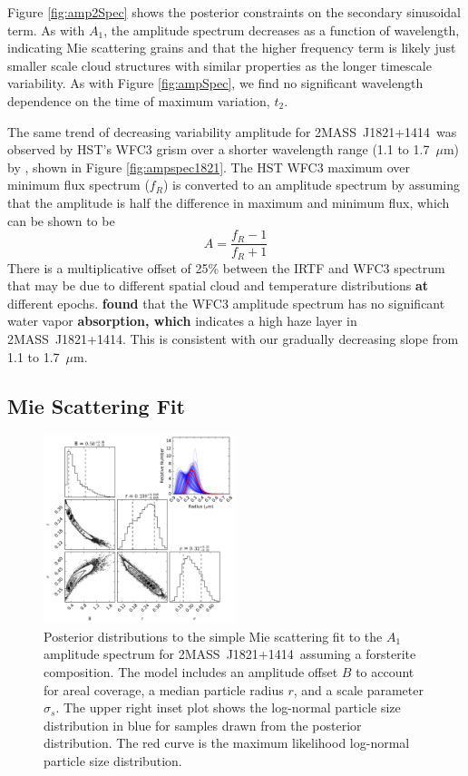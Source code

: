 \documentclass[twocolumn]{aastex6}
\newcommand{\shb}{2MASS~J1821+1414}
\begin{document}
Figure \ref{fig:amp2Spec} shows the posterior constraints on the secondary sinusoidal term.
As with $A_1$, the amplitude spectrum decreases as a function of wavelength, indicating Mie scattering grains and that the higher frequency term is likely just smaller scale cloud structures with similar properties as the longer timescale variability.
As with Figure \ref{fig:ampSpec}, we find no significant wavelength dependence on the time of maximum variation, $t_2$.

The same trend of decreasing variability amplitude for \shb\ was observed by HST's WFC3 grism over a shorter wavelength range (1.1 to 1.7~$\mu$m) by \citet{2015ApJ...798L..13Y}, shown in Figure \ref{fig:ampspec1821}.
The HST WFC3 maximum over minimum flux spectrum ($f_R$) is converted to an amplitude spectrum by assuming that the amplitude is half the difference in maximum and minimum flux, which can be shown to be 
\begin{equation}\label{eq:ampFromRatio}
A  = \frac{f_R - 1}{f_R + 1}
\end{equation}
There is a multiplicative offset of 25\% between the IRTF and WFC3 spectrum that may be due to different spatial cloud and temperature distributions \textbf{at} different epochs.
\citet{2015ApJ...798L..13Y} \textbf{found} that the WFC3 amplitude spectrum has no significant water vapor \textbf{absorption, which} indicates a high haze layer in {\shb}. This is consistent with our gradually decreasing slope from 1.1 to 1.7~$\mu$m.

\subsection{Mie Scattering Fit}

\begin{figure}
\begin{centering}
\includegraphics[width=0.5\textwidth]{corner_j1821_mie_sc.pdf}
\caption{Posterior distributions to the simple Mie scattering fit to the $A_1$ amplitude spectrum for \shb\ assuming a forsterite composition.
The model includes an amplitude offset $B$ to account for areal coverage, a median particle radius $r$, and a scale parameter $\sigma_s$.
The upper right inset plot shows the log-normal particle size distribution in blue for samples drawn from the posterior distribution.
The red curve is the maximum likelihood log-normal particle size distribution.}\label{fig:corner1821mie}
\end{centering}
\end{figure}
\end{document}
